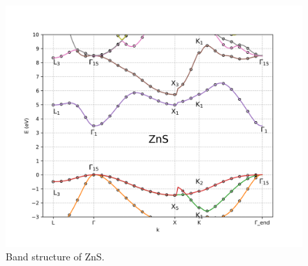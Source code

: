 \documentclass[twocolumn]{article}[h]
\begin{document}
\begin{figure}[htb]
    \centering
    \includegraphics[width=\linewidth]{ZnS.png}
    \vspace{-1cm}
    \caption{Band structure of ZnS.}
    \label{fig:ZnS}
\end{figure}
\end{document}
